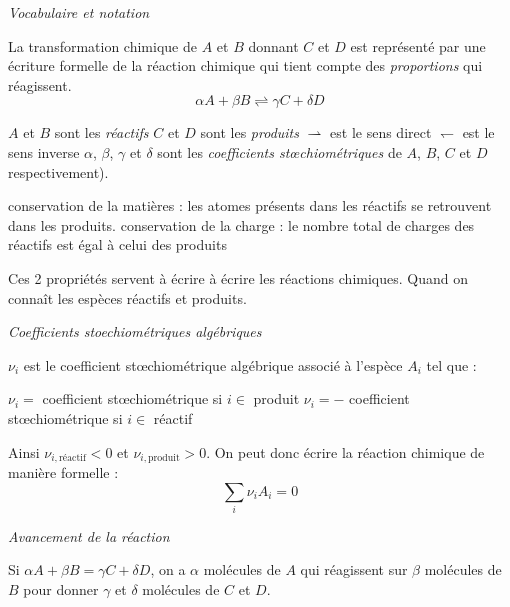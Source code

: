     \begin{center}
        \emph{Vocabulaire et notation}
    \end{center}
    La transformation chimique de $A$ et $B$ donnant $C$ et $D$ est représenté par une écriture formelle de la réaction chimique qui tient compte des \emph{proportions} qui réagissent.
    \[ \alpha A + \beta B \rightleftharpoons \gamma C + \delta D \]
    \begin{enumerate}
        \itt $A$ et $B$ sont les \emph{réactifs}
        \itt $C$ et $D$ sont les \emph{produits}
        \itt $\rightharpoonup$ est le sens direct
        \itt $\leftharpoondown$ est le sens inverse
        \itt $\alpha$, $\beta$, $\gamma$ et $\delta$ sont les \emph{coefficients st\oe{}chiométriques} de $A$, $B$, $C$ et $D$ respectivement).
    \end{enumerate}
    
    
    \begin{property}{}{}
        \begin{enumerate}
            \itt conservation de la matières : les atomes présents dans les réactifs se retrouvent dans les produits.
            \itt conservation de la charge : le nombre total de charges des réactifs est égal à celui des produits
        \end{enumerate}
    \end{property}
    
    Ces 2 propriétés servent à écrire à écrire les réactions chimiques. Quand on connaît les espèces réactifs et produits.
    
    \begin{center}
        \emph{Coefficients stoechiométriques algébriques}
    \end{center}
    
    $\nu_i$ est le coefficient st\oe{}chiométrique algébrique associé à l'espèce $A_i$ tel que :
    \begin{enumerate}
        \itt $\nu_i = $ coefficient st\oe{}chiométrique si $i \in $ produit
        \itt $\nu_i = -$ coefficient st\oe{}chiométrique si $i \in$ réactif
    \end{enumerate}
    Ainsi $\nu_{i,\text{réactif}} < 0$ et $\nu_{i,\text{produit}} > 0$. On peut donc écrire la réaction chimique de manière formelle :
    \[ \sum_i \nu_iA_i = 0\]
    
    
    \begin{center}
        \emph{Avancement de la réaction}
    \end{center}
    Si $\alpha A + \beta B = \gamma C + \delta D$, on a $\alpha$ molécules de $A$ qui réagissent sur $\beta$ molécules de $B$ pour donner $\gamma$ et $\delta$ molécules de $C$ et $D$.
    
